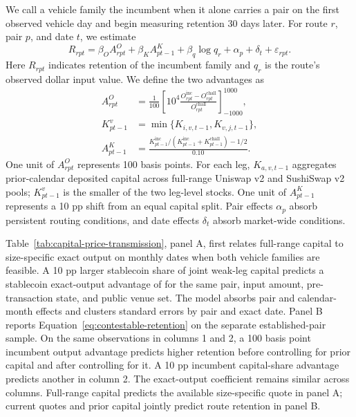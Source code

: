 We call a vehicle family the incumbent when it alone carries a pair on the first observed vehicle day and begin measuring retention 30 days later. For route $r$, pair $p$, and date $t$, we estimate
\begin{equation}
\label{eq:contestable-retention}
R_{rpt}=\beta_O A^O_{rpt}+\beta_K A^K_{pt-1}+\beta_q\log q_r+\alpha_p+\delta_t+\varepsilon_{rpt}.
\end{equation}
Here $R_{rpt}$ indicates retention of the incumbent family and $q_r$ is the route's observed dollar input value. We define the two advantages as
\begin{align*}
A^O_{rpt}
&=\frac{1}{100}\left[
10^4\frac{O^{\mathrm{inc}}_{rpt}-O^{\mathrm{chall}}_{rpt}}
{O^{\mathrm{chall}}_{rpt}}
\right]_{-1000}^{1000},\\
K^v_{pt-1}&=\min\{K_{i,v,t-1},K_{v,j,t-1}\},\\
A^K_{pt-1}
&=\frac{K^{\mathrm{inc}}_{pt-1}/
(K^{\mathrm{inc}}_{pt-1}+K^{\mathrm{chall}}_{pt-1})-1/2}{0.10}.
\end{align*}
One unit of $A^O_{rpt}$ represents 100 basis points. For each leg, $K_{a,v,t-1}$ aggregates prior-calendar deposited capital across full-range Uniswap v2 and SushiSwap v2 pools; $K^v_{pt-1}$ is the smaller of the two leg-level stocks. One unit of $A^K_{pt-1}$ represents a 10 pp shift from an equal capital split. Pair effects $\alpha_p$ absorb persistent routing conditions, and date effects $\delta_t$ absorb market-wide conditions.

Table~\ref{tab:capital-price-transmission}, panel A, first relates full-range capital to size-specific exact output on monthly dates when both vehicle families are feasible. A 10 pp larger stablecoin share of joint weak-leg capital predicts a stablecoin exact-output advantage of \EthStressDepthOutputEffect{} for the same pair, input amount, pre-transaction state, and public venue set. The model absorbs pair and calendar-month effects and clusters standard errors by pair and exact date. Panel B reports Equation~\eqref{eq:contestable-retention} on the separate established-pair sample. On the same observations in columns 1 and 2, a 100 basis point incumbent output advantage predicts \ContestSameSampleOutputAdvantageHundredBpEffect{} higher retention before controlling for prior capital and \ContestOutputAdvantageHundredBpEffect{} after controlling for it. A 10 pp incumbent capital-share advantage predicts another \ContestCapitalAdvantageTenPpEffect{} in column 2. The exact-output coefficient remains similar across columns. Full-range capital predicts the available size-specific quote in panel A; current quotes and prior capital jointly predict route retention in panel B.

